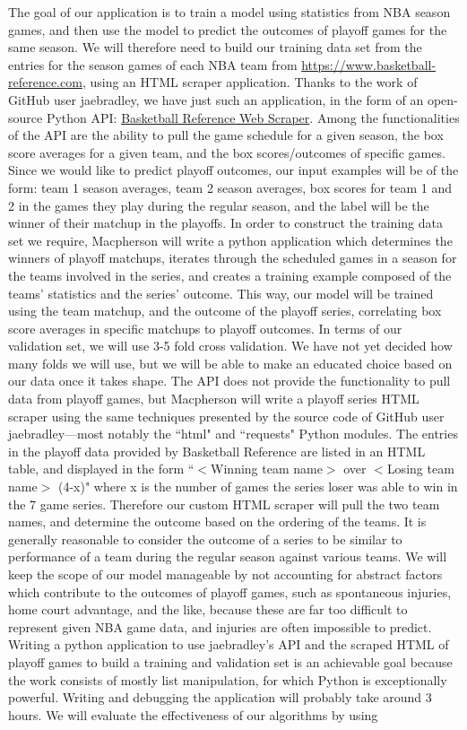 \documentclass[letterpaper]{article} %
\begin{document}
The goal of our application is to train a model using statistics from NBA season games, and then use the model to predict the outcomes of playoff games for the same season. We will therefore need to build our training data set from the entries for the season games of each NBA team from \href{https://www.basketball-reference.com}{https://www.basketball-reference.com}, using an HTML scraper application. Thanks to the work of GitHub user jaebradley, we have just such an application, in the form of an open-source Python API: \href{https://github.com/jaebradley/basketball_reference_web_scraper}{Basketball Reference Web Scraper}. Among the functionalities of the API are the ability to pull the game schedule for a given season, the box score averages for a given team, and the box scores/outcomes of specific games. Since we would like to predict playoff outcomes, our input examples will be of the form: team 1 season averages, team 2 season averages, box scores for team 1 and 2 in the games they play during the regular season, and the label will be the winner of their matchup in the playoffs. In order to construct the training data set we require, Macpherson will write a python application which determines the winners of playoff matchups, iterates through the scheduled games in a season for the teams involved in the series, and creates a training example composed of the teams’ statistics and the series’ outcome. This way, our model will be trained using the team matchup, and the outcome of the playoff series, correlating box score averages in specific matchups to playoff outcomes. In terms of our validation set, we will use 3-5 fold cross validation. We have not yet decided how many folds we will use, but we will be able to make an educated choice based on our data once it takes shape. The API does not provide the functionality to pull data from playoff games, but Macpherson will write a playoff series HTML scraper using the same techniques presented by the source code of GitHub user jaebradley—most notably the ``html" and ``requests" Python modules. The entries in the playoff data provided by Basketball Reference are listed in an HTML table, and displayed in the form ``$<$Winning team name$>$ over $<$Losing team name$>$ (4-x)" where x is the number of games the series loser was able to win in the 7 game series. Therefore our custom HTML scraper will pull the two team names, and determine the outcome based on the ordering of the teams. It is generally reasonable to consider the outcome of a series to be similar to performance of a team during the regular season against various teams. We will keep the scope of our model manageable by not accounting for abstract factors which contribute to the outcomes of playoff games, such as spontaneous injuries, home court advantage, and the like, because these are far too difficult to represent given NBA game data, and injuries are often impossible to predict. Writing a python application to use jaebradley’s API and the scraped HTML of playoff games to build a training and validation set is an achievable goal because the work consists of mostly list manipulation, for which Python is exceptionally powerful. Writing and debugging the application will probably take around 3 hours. We will evaluate the effectiveness of our algorithms by using 
\end{document}
